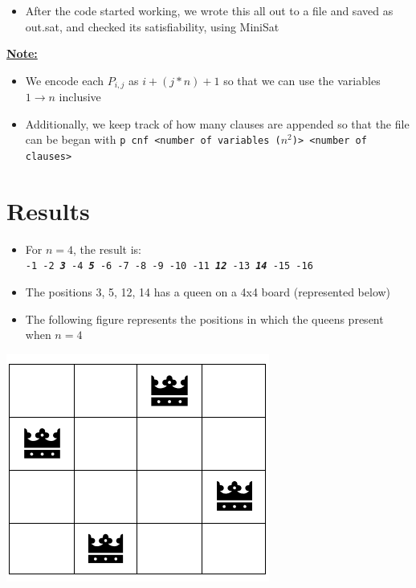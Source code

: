 \documentclass[12pt, letterpaper]{article}
\begin{document}
\begin{itemize}
    \item After the code started working, we wrote this all out to a file and saved as out.sat, and checked its satisfiability, using MiniSat
\end{itemize}
\textbf{\underline{Note:}}
\begin{itemize}
    \item We encode each $P_{i,j}$ as $i + (j * n) + 1$ so that we can use the variables $1 \rightarrow{} n$ inclusive
    \item Additionally, we keep track of how many clauses are appended so that the file can be began with \texttt{p cnf <number of variables ($n^2$)> <number of clauses>}
\end{itemize}


\section*{Results}
\begin{itemize}
    \item For $n=4$, the result is:\\
    \texttt{-1 -2 \textbf{\textit{3}} -4 \textbf{\textit{5}} -6 -7 -8 -9 -10 -11 \textbf{\textit{12}} -13 \textbf{\textit{14}} -15 -16}
    \item The positions 3, 5, 12, 14 has a queen on a 4x4 board (represented below)
    \item The following figure represents the positions in which the queens present when $n=4$\\
\end{itemize}

\begin{center}
\includegraphics[scale=0.75]{image.png}
\end{center}
\end{document}
